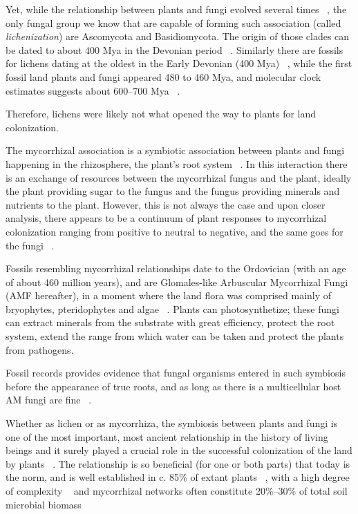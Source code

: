 Yet, while the relationship between plants and fungi evolved several times ~\citep{gargas1995}, the only fungal group we know that are capable of forming such association (called \emph{lichenization}) are Ascomycota and Basidiomycota. The origin of those clades can be dated to about 400 Mya in the Devonian period ~\citep{berbee1993}. Similarly there are fossils for lichens dating at the oldest in the Early Devonian (400 Mya) ~\citep{taylor1997, honegger2013}, while the first fossil land plants and fungi appeared 480 to 460 Mya, and molecular clock estimates suggests about 600--700 Mya ~\citep{berbee1993, heckman2001}.

Therefore, lichens were likely not what opened the way to plants for land colonization.

The mycorrhizal association is a symbiotic association between plants and fungi happening in the rhizosphere, the plant's root system ~\citep{barman2016}. In this interaction there is an exchange of resources between the mycorrhizal fungus and the plant, ideally the plant providing sugar to the fungus and the fungus providing minerals and nutrients to the plant. However, this is not always the case and upon closer analysis, there appears to be a continuum of plant responses to mycorrhizal colonization ranging from positive to neutral to negative, and the same goes for the fungi ~\citep{johnson1997}.

Fossils resembling mycorrhizal relationships date to the Ordovician (with an age of about 460 million years), and are Glomales-like Arbuscular Mycorrhizal Fungi (AMF hereafter), in a moment where the land flora was comprised mainly of bryophytes, pteridophytes and algae ~\citep{redecker2000}. Plants can photosynthetize; these fungi can extract minerals from the substrate with great efficiency, protect the root system, extend the range from which water can be taken and protect the plants from pathogens.

Fossil records provides evidence that fungal organisms entered in such symbiosis before the appearance of true roots, and as long as there is a multicellular host AM fungi are fine ~\citep{wang2006, bonfante2008}.

Whether as lichen or as mycorrhiza, the symbiosis between plants and fungi is one of the most important, most ancient relationship in the history of living beings and it surely played a crucial role in the successful colonization of the land by plants ~\citep{pirozynski1975, malloch1980, harley1987, trappe1987, selosse1998, brundrett2002}. The relationship is so beneficial (for one or both parts) that today is the norm, and is well established in c. 85\% of extant plants ~\citep{cairney2000, strullu-derrien2018}, with a high degree of complexity ~\citep{heijden2015} and mycorrhizal networks often constitute 20\%–30\% of total soil microbial biomass ~\citep{leake2011}

